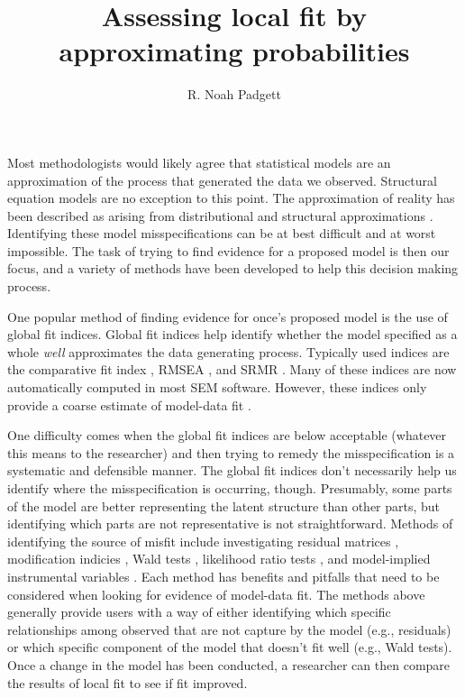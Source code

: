\documentclass[man, noextraspace, floatsintext, 12pt]{apa7}
\title{Assessing local fit by approximating probabilities}
\author{R. Noah Padgett}
\begin{document}
\maketitle

\setlength{\abovedisplayskip}{3pt}
\setlength{\belowdisplayskip}{3pt}

Most methodologists would likely agree that statistical models are an approximation of the process that generated the data we observed.
Structural equation models are no exception to this point.
The approximation of reality has been described as arising from distributional and structural approximations \citep{Bollen2019}.
Identifying these model misspecifications can be at best difficult and at worst impossible.
The task of trying to find evidence for a proposed model is then our focus, and a variety of methods have been developed to help this decision making process.

One popular method of finding evidence for once's proposed model is the use of global fit indices.
Global fit indices help identify whether the model specified as a whole \textit{well} approximates the data generating process.
Typically used indices are the comparative fit index \citep{Bentler1990}, RMSEA \citep{Browne1992}, and SRMR \citep{Bentler1995, Maydeu2018, Joreskog1981}.
Many of these indices are now automatically computed in most SEM software.
However, these indices only provide a coarse estimate of model-data fit \citep{Steiger2007}.

One difficulty comes when the global fit indices are below acceptable (whatever this means to the researcher) and then trying to remedy the misspecification is a systematic and defensible manner.
The global fit indices don't necessarily help us identify where the misspecification is occurring, though.
Presumably, some parts of the model are better representing the latent structure than other parts, but identifying which parts are not representative is not straightforward.
Methods of identifying the source of misfit include investigating residual matrices \citep{Kline2015, Maydeu2017}, modification indicies \citep{Sorbom1989, Kaplan1989}, Wald tests \citep{Wald1943, Buse1982}, likelihood ratio tests \citep{Neyman1928, Buse1982}, and model-implied instrumental variables \citep{Bollen1995, Bollen2019}.
Each method has benefits and pitfalls that need to be considered when looking for evidence of model-data fit. 
The methods above generally provide users with a way of either identifying which specific relationships among observed that are not capture by the model (e.g., residuals) or which specific component of the model that doesn't fit well (e.g., Wald tests).
Once a change in the model has been conducted, a researcher can then compare the results of local fit to see if fit improved.
\end{document}
